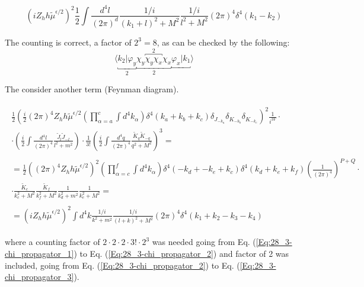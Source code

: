 \documentclass[twoside]{amsart}
\begin{document}
\[
(i Z_h h \widetilde{\mu}^{\epsilon/2} )^2 \frac{1}{2} \int \frac{ d^4l}{(2\pi)^d} \frac{ 1 /i }{ (k_1 + l)^2 + M^2 } \frac{ 1/ i }{ l^2 + M^2 } (2\pi)^4 \delta^4(k_1 - k_2)
\]

The counting is correct, a factor of $2^3 = 8$, as can be checked by the following:
\[
\langle \underbracket{ k_2 | \varphi_y }_2 \underbracket{ \chi_y \overbracket{ \chi_y \chi_x}^2 \chi_x }_2 \underbracket{ \varphi_x | k_1 } \rangle 
\]

The consider another term (Feynman diagram).

\begin{gather}
  \begin{gathered}
    \frac{1}{2} \left( \frac{i}{2} (2\pi)^4 Z_h h \widetilde{\mu}^{\epsilon/2} \left( \prod_{\alpha = a}^c  \int d^4k_{\alpha } \right) \delta^4( k_a + k_b + k_c) \delta_{J_{-k_a}} \delta_{K_{-k_b}} \delta_{K_{-k_c}} \right)^2 \frac{1}{i^{3V}} \cdot \\ 
    \cdot \left( \frac{i}{2} \int \frac{d^4l}{(2\pi)^4} \frac{ \widetilde{J}_l \widetilde{J}_{-l} }{ l^2 + m^2 } \right) \cdot \frac{1}{3!} \left( \frac{i}{2} \int \frac{ d^4 q}{ (2\pi)^4} \frac{ \widetilde{K}_q \widetilde{K}_{-q} }{ q^2 + M^2 } \right)^3 = 
  \end{gathered} \label{Eq:28_3-chi_propagator_1} \\
  \begin{gathered}
    = \frac{1}{2} ( (2\pi)^4 Z_h h \widetilde{\mu}^{\epsilon/2} )^2 \left( \prod_{\alpha = c}^f \int d^4k_{\alpha} \right) \delta^4(-k_d +  - k_e + k_c) \delta^4(k_d + k_e + k_f) \left( \frac{1}{ (2\pi)^4} \right)^{P+Q} \cdot \\
    \cdot \frac{ \widetilde{K}_c }{ k_c^2 + M^2 }   \frac{ \widetilde{K}_f }{ k_f^2 + M^2 }  \frac{1}{ k_d^2 + m^2 } \frac{1}{ k_e^2 + M^2 }  = 
  \end{gathered} \label{Eq:28_3-chi_propagator_2} \\
  \begin{gathered}
    = (i Z_h h \widetilde{\mu}^{\epsilon/2} )^2 \int d^4k \frac{ 1 / i }{ k^2 + m^2 } \frac{ 1 /i}{ (l+k)^2 + M^2 } (2\pi)^4 \delta^4(k_1 +k_2  - k_3 - k_4) 
    \end{gathered} \label{Eq:28_3-chi_propagator_3} 
\end{gather}

where a counting factor of $2 \cdot 2 \cdot 2 \cdot 3! \cdot 2^3$ was needed going from Eq. (\ref{Eq:28_3-chi_propagator_1}) to Eq. (\ref{Eq:28_3-chi_propagator_2}) and factor of 2 was included, going from Eq. (\ref{Eq:28_3-chi_propagator_2}) to Eq. (\ref{Eq:28_3-chi_propagator_3}).  
\end{document}
